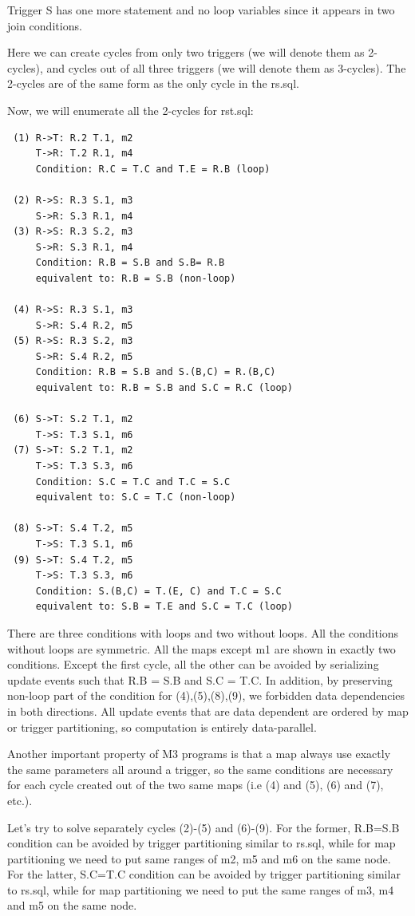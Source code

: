 \documentclass{sig-semester}
\begin{document}
Trigger S has one more statement and no loop variables since it appears in two join conditions.

Here we can create cycles from only two triggers (we will denote them as 2-cycles), and cycles out of all three triggers (we will denote them as 3-cycles). The 2-cycles are of the same form as the only cycle in the rs.sql.

Now, we will enumerate all the 2-cycles for rst.sql:
\begin{verbatim}
 (1) R->T: R.2 T.1, m2
     T->R: T.2 R.1, m4
     Condition: R.C = T.C and T.E = R.B (loop)

 (2) R->S: R.3 S.1, m3
     S->R: S.3 R.1, m4
 (3) R->S: R.3 S.2, m3
     S->R: S.3 R.1, m4
     Condition: R.B = S.B and S.B= R.B
     equivalent to: R.B = S.B (non-loop)

 (4) R->S: R.3 S.1, m3
     S->R: S.4 R.2, m5
 (5) R->S: R.3 S.2, m3
     S->R: S.4 R.2, m5
     Condition: R.B = S.B and S.(B,C) = R.(B,C)
     equivalent to: R.B = S.B and S.C = R.C (loop)

 (6) S->T: S.2 T.1, m2
     T->S: T.3 S.1, m6
 (7) S->T: S.2 T.1, m2
     T->S: T.3 S.3, m6
     Condition: S.C = T.C and T.C = S.C
     equivalent to: S.C = T.C (non-loop)

 (8) S->T: S.4 T.2, m5
     T->S: T.3 S.1, m6
 (9) S->T: S.4 T.2, m5
     T->S: T.3 S.3, m6
     Condition: S.(B,C) = T.(E, C) and T.C = S.C
     equivalent to: S.B = T.E and S.C = T.C (loop)
\end{verbatim}

There are three conditions with loops and two without loops. All the conditions without loops are symmetric. All the maps except m1 are shown in exactly two conditions. Except the first cycle, all the other can be avoided by serializing update events such that R.B = S.B and S.C = T.C. In addition, by preserving non-loop part of the condition for (4),(5),(8),(9), we forbidden data dependencies in both directions. All update events that are data dependent are ordered by map or trigger partitioning, so computation is entirely data-parallel.

Another important property of M3 programs is that a map always use exactly the same parameters all around a trigger, so the same conditions are necessary for each cycle created out of the two same maps (i.e (4) and (5), (6) and (7), etc.).

Let's try to solve separately cycles (2)-(5) and (6)-(9). For the former, R.B=S.B condition can be avoided by trigger partitioning similar to rs.sql, while for map partitioning we need to put same ranges of m2, m5 and m6 on the same node. For the latter, S.C=T.C condition can be avoided by trigger partitioning similar to rs.sql, while for map partitioning we need to put the same ranges of m3, m4 and m5 on the same node.
\end{document}
